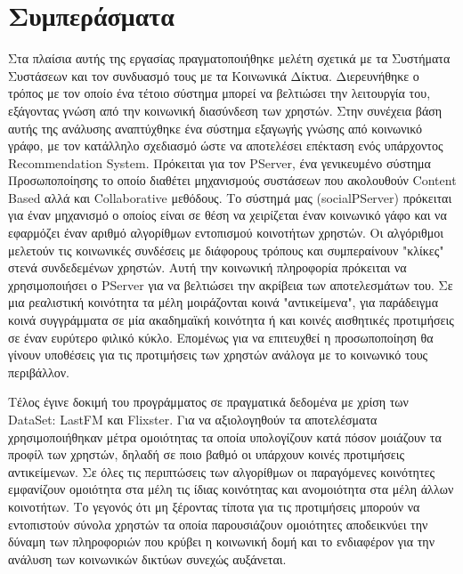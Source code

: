 \clearpage

\section{Συμπεράσματα}
\noindent
Στα πλαίσια αυτής της εργασίας πραγματοποιήθηκε μελέτη σχετικά με τα Συστήματα Συστάσεων και τον συνδυασμό τους με τα Κοινωνικά Δίκτυα.
Διερευνήθηκε ο τρόπος με τον οποίο ένα τέτοιο σύστημα μπορεί να βελτιώσει την λειτουργία του, εξάγοντας γνώση από την κοινωνική διασύνδεση των χρηστών. 
Στην συνέχεια βάση αυτής της ανάλυσης αναπτύχθηκε ένα σύστημα εξαγωγής γνώσης από κοινωνικό γράφο, με τον κατάλληλο σχεδιασμό ώστε να αποτελέσει επέκταση ενός υπάρχοντος 
Recommendation System. Πρόκειται για τον PServer, ένα γενικευμένο σύστημα Προσωποποίησης το οποίο διαθέτει μηχανισμούς συστάσεων που ακολουθούν Content Based αλλά και Collaborative μεθόδους. 
Το σύστημά μας (socialPServer) πρόκειται για έναν μηχανισμό ο οποίος είναι σε θέση να χειρίζεται έναν κοινωνικό γάφο και να εφαρμόζει έναν αριθμό αλγορίθμων εντοπισμού κοινοτήτων χρηστών. 
Οι αλγόριθμοι μελετούν τις κοινωνικές συνδέσεις με διάφορους τρόπους και συμπεραίνουν "κλίκες" στενά συνδεδεμένων χρηστών. Αυτή την κοινωνική πληροφορία πρόκειται να χρησιμοποιήσει
ο PServer για να βελτιώσει την ακρίβεια των αποτελεσμάτων του.
Σε μια ρεαλιστική κοινότητα τα μέλη μοιράζονται κοινά "αντικείμενα", για παράδειγμα κοινά συγγράμματα σε 
μία ακαδημαϊκή κοινότητα ή και κοινές αισθητικές προτιμήσεις σε έναν ευρύτερο φιλικό κύκλο. Επομένως για να επιτευχθεί η προσωποποίηση θα γίνουν υποθέσεις για τις προτιμήσεις των χρηστών 
ανάλογα με το κοινωνικό τους περιβάλλον. 

Τέλος έγινε δοκιμή του προγράμματος σε πραγματικά δεδομένα με χρίση των DataSet: LastFM και Flixster. Για να αξιολογηθούν τα αποτελέσματα χρησιμοποιήθηκαν μέτρα ομοιότητας τα οποία 
υπολογίζουν κατά πόσον μοιάζουν τα προφίλ των χρηστών, δηλαδή σε ποιο βαθμό οι υπάρχουν κοινές προτιμήσεις αντικείμενων. Σε όλες τις περιπτώσεις των αλγορίθμων οι παραγόμενες κοινότητες 
εμφανίζουν ομοιότητα στα μέλη τις ίδιας κοινότητας και ανομοιότητα στα μέλη άλλων κοινοτήτων. Το γεγονός ότι μη ξέροντας τίποτα για τις προτιμήσεις μπορούν να εντοπιστούν σύνολα χρηστών
τα οποία παρουσιάζουν ομοιότητες αποδεικνύει την δύναμη των πληροφοριών που κρύβει η κοινωνική δομή και το ενδιαφέρον για την ανάλυση των κοινωνικών δικτύων συνεχώς αυξάνεται.
